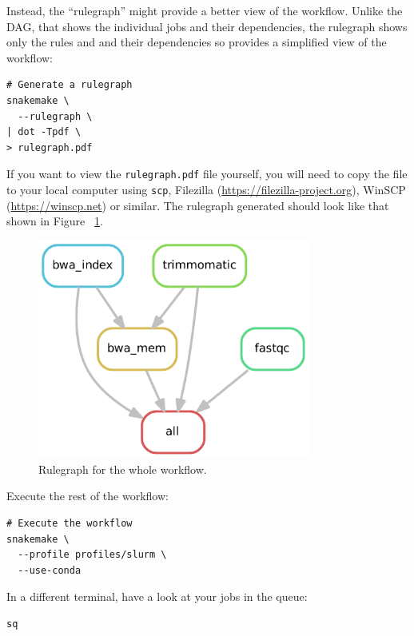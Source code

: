 Instead, the ``rulegraph'' might provide a better view of the workflow.
Unlike the DAG, that shows the individual jobs and their dependencies, the rulegraph shows only the rules and and their dependencies so provides a simplified view of the workflow:

\begin{lstlisting}
# Generate a rulegraph
snakemake \
  --rulegraph \
| dot -Tpdf \
> rulegraph.pdf
\end{lstlisting}

\begin{warning}

If you want to view the \texttt{rulegraph.pdf} file yourself, you will need to copy the file to your local computer using \texttt{scp}, Filezilla (\url{https://filezilla-project.org}), WinSCP (\url{https://winscp.net}) or similar.
The rulegraph generated should look like that shown in Figure ~\ref{fig:rulegraph}.

\end{warning}

\begin{figure}[H]
\centering
\includegraphics[width=0.8\textwidth]{handout/rulegraph.pdf}
\caption{Rulegraph for the whole workflow.}
\label{fig:rulegraph}
\end{figure}

Execute the rest of the workflow:

\begin{lstlisting}
# Execute the workflow
snakemake \
  --profile profiles/slurm \
  --use-conda
\end{lstlisting}

In a different terminal, have a look at your jobs in the queue:

\begin{lstlisting}
sq
\end{lstlisting}

